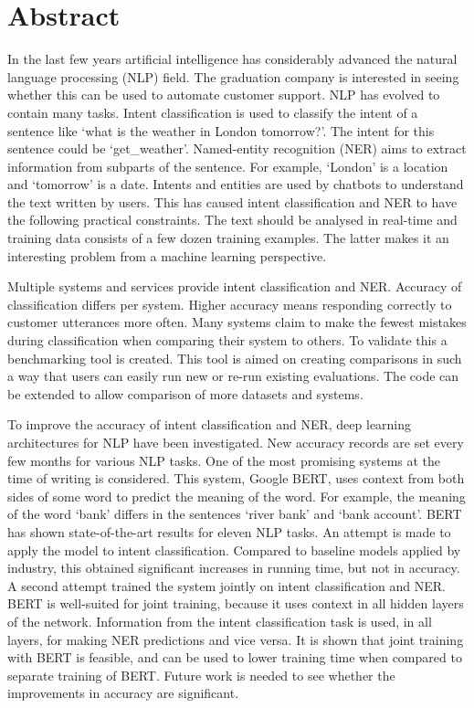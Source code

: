 \chapter*{Abstract}
\label{ch:abstract}

In the last few years artificial intelligence has considerably advanced the natural language processing (NLP) field.
The graduation company is interested in seeing whether this can be used to automate customer support.
NLP has evolved to contain many tasks.
Intent classification is used to classify the intent of a sentence like `what is the weather in London tomorrow?'.
The intent for this sentence could be `get\_weather'.
Named-entity recognition (NER) aims to extract information from subparts of the sentence.
For example, `London' is a location and `tomorrow' is a date.
Intents and entities are used by chatbots to understand the text written by users.
This has caused intent classification and NER to have the following practical constraints.
The text should be analysed in real-time and training data consists of a few dozen training examples.
The latter makes it an interesting problem from a machine learning perspective.

Multiple systems and services provide intent classification and NER.
Accuracy of classification differs per system.
Higher accuracy means responding correctly to customer utterances more often.
Many systems claim to make the fewest mistakes during classification when comparing their system to others.
To validate this a benchmarking tool is created.
This tool is aimed on creating comparisons in such a way that users can easily run new or re-run existing evaluations.
The code can be extended to allow comparison of more datasets and systems.

To improve the accuracy of intent classification and NER, deep learning architectures for NLP have been investigated.
New accuracy records are set every few months for various NLP tasks.
One of the most promising systems at the time of writing is considered.
This system, Google BERT, uses context from both sides of some word to predict the meaning of the word.
For example, the meaning of the word `bank' differs in the sentences `river bank' and `bank account'.
BERT has shown state-of-the-art results for eleven NLP tasks.
An attempt is made to apply the model to intent classification.
Compared to baseline models applied by industry, this obtained significant increases in running time, but not in accuracy.
A second attempt trained the system jointly on intent classification and NER.
BERT is well-suited for joint training, because it uses context in all hidden layers of the network.
Information from the intent classification task is used, in all layers, for making NER predictions and vice versa.
It is shown that joint training with BERT is feasible, and can be used to lower training time when compared to separate training of BERT.
Future work is needed to see whether the improvements in accuracy are significant.

